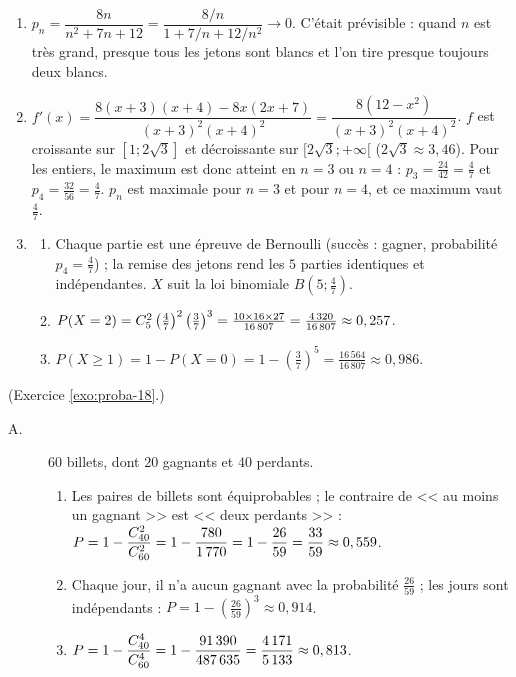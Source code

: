 \begin{corrige}
\begin{sol}
\begin{enumerate}
      $p_n = \dfrac{4n}{(n+4)(n+3)/2} = \dfrac{8n}{(n+3)(n+4)}$.
\item $p_n = \dfrac{8n}{n^2 + 7n + 12} = \dfrac{8/n}{1 + 7/n + 12/n^2} \to 0$.
      C'\'etait pr\'evisible : quand $n$ est tr\`es grand, presque tous les jetons sont blancs et l'on tire presque toujours deux blancs.
\item $f'(x) = \dfrac{8(x+3)(x+4) - 8x(2x+7)}{(x+3)^2(x+4)^2} = \dfrac{8(12 - x^2)}{(x+3)^2(x+4)^2}$.
      $f$ est croissante sur $[1 ; 2\sqrt{3}]$ et d\'ecroissante sur $[2\sqrt{3} ; +\infty[$ ($2\sqrt{3}\approx 3,46$).
      Pour les entiers, le maximum est donc atteint en $n=3$ ou $n=4$ : $p_3 = \frac{24}{42} = \frac{4}{7}$ et $p_4 = \frac{32}{56} = \frac{4}{7}$.
      $p_n$ est maximale pour $n = 3$ et pour $n = 4$, et ce maximum vaut $\frac{4}{7}$.
\item \begin{enumerate}
      \item Chaque partie est une \'epreuve de Bernoulli (succ\`es : gagner, probabilit\'e $p_4 = \frac{4}{7}$) ;
            la remise des jetons rend les $5$ parties identiques et ind\'ependantes. $X$ suit la loi binomiale $B\!\left(5 ; \frac{4}{7}\right)$.
      \item $P(X=2) = C_{5}^{2}\left(\frac{4}{7}\right)^2\left(\frac{3}{7}\right)^3 = \frac{10\times 16\times 27}{16\,807} = \frac{4\,320}{16\,807}\approx 0,257$.
      \item $P(X\geq 1) = 1 - P(X=0) = 1 - \left(\frac{3}{7}\right)^5 = \frac{16\,564}{16\,807}\approx 0,986$.
      \end{enumerate}
\end{enumerate}
\end{sol}
%
\begin{sol} (Exercice \ref{exo:proba-18}.)
\begin{description}
\item[A.] $60$ billets, dont $20$ gagnants et $40$ perdants.
      \begin{enumerate}
      \item Les paires de billets sont \'equiprobables ; le contraire de << au moins un gagnant >> est << deux perdants >> :
            $P = 1 - \dfrac{C_{40}^{2}}{C_{60}^{2}} = 1 - \dfrac{780}{1\,770} = 1 - \dfrac{26}{59} = \dfrac{33}{59}\approx 0,559$.
      \item Chaque jour, il n'a aucun gagnant avec la probabilit\'e $\frac{26}{59}$ ; les jours sont ind\'ependants :
            $P = 1 - \left(\frac{26}{59}\right)^3 \approx 0,914$.
      \item $P = 1 - \dfrac{C_{40}^{4}}{C_{60}^{4}} = 1 - \dfrac{91\,390}{487\,635} = \dfrac{4\,171}{5\,133}\approx 0,813$.

\end{enumerate}
\end{description}
\end{sol}
\end{corrige}
